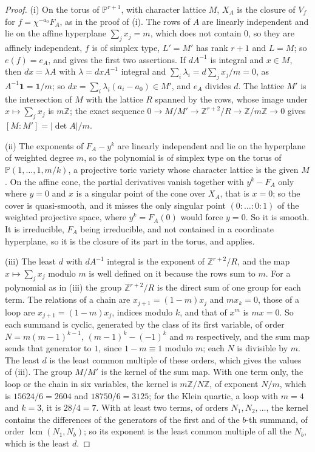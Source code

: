 \documentclass[11pt,reqno]{amsart}
\theoremstyle{plain}
\theoremstyle{definition}
\theoremstyle{remark}
\newcommand{\ZZ}{\mathbb{Z}}
\newcommand{\PP}{\mathbb{P}}
\begin{document}
\begin{proof}
(i) On the torus of $\PP^{r+1}$, with character lattice $M$, $X_{A}$ is the
closure of $V_{f}$ for $f=\chi^{-a_{0}}F_{A}$, as in the proof of
(i). The rows of $A$ are linearly independent and lie on
the affine hyperplane $\sum_{j}x_{j}=m$, which does not contain $0$, so they
are affinely independent, $f$ is of simplex type, $L'=M'$ has rank $r+1$ and
$L=M$; so $e(f)=e_{A}$, and  gives the first two
assertions. If $dA^{-1}$ is integral and $x\in M$, then $dx=\lambda A$ with
$\lambda=dxA^{-1}$ integral and $\sum_{i}\lambda_{i}=d\sum_{j}x_{j}/m=0$,
as $A^{-1}\mathbf{1}=\mathbf{1}/m$; so $dx=\sum_{i}\lambda_{i}(a_{i}-a_{0})
\in M'$, and $e_{A}$ divides $d$. The lattice $M'$ is the intersection of $M$
with the lattice $R$ spanned by the rows, whose image under
$x\mapsto\sum_{j}x_{j}$ is $m\ZZ$; the exact sequence $0\to M/M'\to
\ZZ^{r+2}/R\to\ZZ/m\ZZ\to0$ gives $[M:M']=|\det A|/m$.

(ii) The exponents of $F_{A}-y^{k}$ are linearly independent and lie on the
hyperplane of weighted degree $m$, so the polynomial is of simplex type on
the torus of $\PP(1,\dots,1,m/k)$, a projective toric variety whose
character lattice is the given $M$. On the affine cone, the partial
derivatives vanish together with $y^{k}-F_{A}$ only where $y=0$ and $x$ is a
singular point of the cone over $X_{A}$, that is $x=0$; so the cover is
quasi-smooth, and it misses the only singular point $(0:\dots:0:1)$ of the
weighted projective space, where $y^{k}=F_{A}(0)$ would force $y=0$. So it is
smooth. It is irreducible, $F_{A}$ being irreducible, and not contained in a
coordinate hyperplane, so it is the closure of its part in the torus, and
 applies.

(iii) The least $d$ with $dA^{-1}$ integral is the exponent of
$\ZZ^{r+2}/R$, and the map $x\mapsto\sum_{j}x_{j}$ modulo $m$ is well defined
on it because the rows sum to $m$. For a polynomial as in
(iii) the group $\ZZ^{r+2}/R$ is the direct sum of one
group for each term. The relations of a chain are $x_{j+1}=(1-m)x_{j}$ and
$mx_{k}=0$, those of a loop are $x_{j+1}=(1-m)x_{j}$, indices modulo $k$, and
that of $x^{m}$ is $mx=0$. So each summand is cyclic, generated by the class
of its first variable, of order $N=m(m-1)^{k-1}$, $(m-1)^{k}-(-1)^{k}$ and
$m$ respectively, and the sum map sends that generator to $1$, since
$1-m\equiv1$ modulo $m$; each $N$ is divisible by $m$. The least $d$ is the
least common multiple of these orders, which gives the values of
(iii). The group $M/M'$ is the kernel of the sum map. With
one term only, the loop or the chain in six variables, the kernel is
$m\ZZ/N\ZZ$, of exponent $N/m$, which is $15624/6=2604$ and $18750/6=3125$;
for the Klein quartic, a loop with $m=4$ and $k=3$, it is $28/4=7$. With at
least two terms, of orders $N_{1},N_{2},\dots$, the kernel contains the
differences of the generators of the first and of the $b$-th summand, of order
$\operatorname{lcm}(N_{1},N_{b})$; so its exponent is the least common multiple
of all the $N_{b}$, which is the least $d$.
\end{proof}
\end{document}
